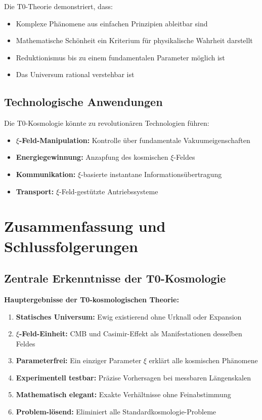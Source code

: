 \documentclass[12pt,a4paper]{article}
\newcommand{\xipar}{\xi}
\begin{document}
	Die T0-Theorie demonstriert, dass:
	
	\begin{itemize}
		\item Komplexe Phänomene aus einfachen Prinzipien ableitbar sind
		\item Mathematische Schönheit ein Kriterium für physikalische Wahrheit darstellt
		\item Reduktionismus bis zu einem fundamentalen Parameter möglich ist
		\item Das Universum rational verstehbar ist
	\end{itemize}
	
	
	\subsection{Technologische Anwendungen}
	
	Die T0-Kosmologie könnte zu revolutionären Technologien führen:
	
	\begin{itemize}
		\item \textbf{$\xi$-Feld-Manipulation:} Kontrolle über fundamentale Vakuumeigenschaften
		\item \textbf{Energiegewinnung:} Anzapfung des kosmischen $\xi$-Feldes
		\item \textbf{Kommunikation:} $\xi$-basierte instantane Informationsübertragung
		\item \textbf{Transport:} $\xi$-Feld-gestützte Antriebssysteme
	\end{itemize}
	
	\section{Zusammenfassung und Schlussfolgerungen}
	
	\subsection{Zentrale Erkenntnisse der T0-Kosmologie}
	
	\begin{keyresult}
		\textbf{Hauptergebnisse der T0-kosmologischen Theorie:}
		
		\begin{enumerate}
			\item \textbf{Statisches Universum:} Ewig existierend ohne Urknall oder Expansion
			\item \textbf{$\xi$-Feld-Einheit:} CMB und Casimir-Effekt als Manifestationen desselben Feldes
			\item \textbf{Parameterfrei:} Ein einziger Parameter $\xipar$ erklärt alle kosmischen Phänomene
			\item \textbf{Experimentell testbar:} Präzise Vorhersagen bei messbaren Längenskalen
			\item \textbf{Mathematisch elegant:} Exakte Verhältnisse ohne Feinabstimmung
			\item \textbf{Problem-lösend:} Eliminiert alle Standardkosmologie-Probleme
		\end{enumerate}
	\end{keyresult}
	
\end{document}
